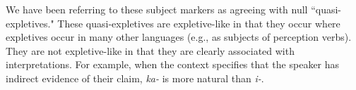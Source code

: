 \documentclass[output=paper,colorlinks,citecolor=brown
]{langscibook}
\begin{document}
















We have been referring to these subject markers as agreeing with null ``quasi-expletives." These quasi-expletives are expletive-like in that they occur where expletives occur in many other languages (e.g., as subjects of perception verbs). They are not expletive-like in that they are clearly associated with interpretations. For example, when the context specifies that the speaker has indirect evidence of their claim, \textit{ka-} is more natural than \textit{i-}.

\ea\label{ex:johnson:HrWithIndirectEvidence}
\end{document}
